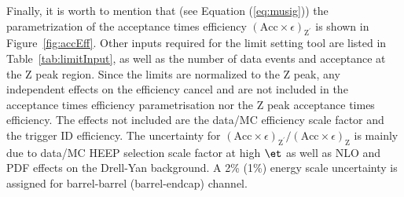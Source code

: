Finally, it is worth to mention that (see Equation (\ref{eq:musig})) the parametrization of the acceptance times efficiency $(\mathrm{Acc}\times\epsilon)_{\mathrm{Z}^{'}}$ is shown in Figure~\ref{fig:accEff}. Other inputs required for the limit setting tool are listed in Table~\ref{tab:limitInput}, as well as the number of data events and acceptance at the Z peak region. Since the limits are normalized to the Z peak, any \et independent effects on the efficiency cancel and are not included in the acceptance times efficiency parametrisation nor the Z peak acceptance times efficiency. The effects not included are the data/MC efficiency scale factor and the trigger ID efficiency.
The uncertainty for $(\mathrm{Acc}\times\epsilon)_{\mathrm{Z}^{'}}/(\mathrm{Acc}\times\epsilon)_{\mathrm{Z}}$ is mainly due to data/MC HEEP selection scale factor at high $\et$ as well as NLO and PDF effects on the Drell-Yan background. A 2\% (1\%) energy scale uncertainty is assigned for barrel-barrel (barrel-endcap) channel.

